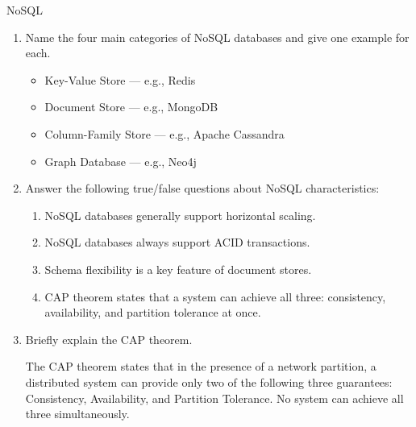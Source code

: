 \documentclass{article}
\begin{document}
\begin{exercise}{NoSQL}
  \begin{enumerate}
    \item Name the four main categories of NoSQL databases and give one example for each. \begin{solution}
      \begin{itemize}
        \item Key-Value Store — e.g., Redis
        \item Document Store — e.g., MongoDB
        \item Column-Family Store — e.g., Apache Cassandra
        \item Graph Database — e.g., Neo4j
      \end{itemize}
    \end{solution}

    \item Answer the following true/false questions about NoSQL characteristics:
      \begin{enumerate}
        \item NoSQL databases generally support horizontal scaling. 
        \item NoSQL databases always support ACID transactions. 
        \item Schema flexibility is a key feature of document stores. 
        \item CAP theorem states that a system can achieve all three: consistency, availability, and partition tolerance at once. 
      \end{enumerate}

    \item Briefly explain the CAP theorem. \begin{solution}
      The CAP theorem states that in the presence of a network partition, a distributed system can provide only two of the following three guarantees: Consistency, Availability, and Partition Tolerance. No system can achieve all three simultaneously.
    \end{solution}


\end{enumerate}
\end{exercise}
\end{document}
